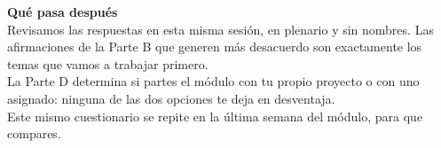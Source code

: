 \documentclass[11pt,a4paper]{article}
\begin{document}
\vspace{14pt}
\noindent\begin{tcolorbox}[
  enhanced, colback=softBlue, colframe=softBlue,
  boxrule=0pt, arc=3pt, left=12pt, right=12pt, top=8pt, bottom=8pt]
{\color{aiepNavy}\bfseries Qué pasa después}\\[4pt]
\small
Revisamos las respuestas en esta misma sesión, en plenario y sin nombres. Las afirmaciones de la
Parte B que generen más desacuerdo son exactamente los temas que vamos a trabajar primero.\\[4pt]
La Parte D determina si partes el módulo con tu propio proyecto o con uno asignado: ninguna de las
dos opciones te deja en desventaja.\\[4pt]
Este mismo cuestionario se repite en la última semana del módulo, para que compares.
\end{tcolorbox}
\end{document}
